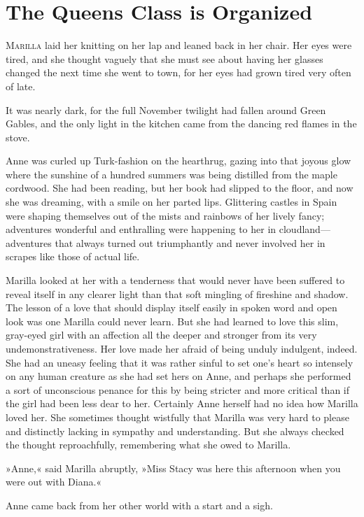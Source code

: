 \chapter{The Queens Class is Organized}

\lettrine[lines=4]{M}{arilla} laid her knitting on her lap and leaned back in her chair. Her eyes were tired, and she thought vaguely that she must see about having her glasses changed the next time she went to town, for her eyes had grown tired very often of late.

It was nearly dark, for the full November twilight had fallen around Green Gables, and the only light in the kitchen came from the dancing red flames in the stove.

Anne was curled up Turk-fashion on the hearthrug, gazing into that joyous glow where the sunshine of a hundred summers was being distilled from the maple cordwood. She had been reading, but her book had slipped to the floor, and now she was dreaming, with a smile on her parted lips. Glittering castles in Spain were shaping themselves out of the mists and rainbows of her lively fancy; adventures wonderful and enthralling were happening to her in cloudland—adventures that always turned out triumphantly and never involved her in scrapes like those of actual life.

Marilla looked at her with a tenderness that would never have been suffered to reveal itself in any clearer light than that soft mingling of fireshine and shadow. The lesson of a love that should display itself easily in spoken word and open look was one Marilla could never learn. But she had learned to love this slim, gray-eyed girl with an affection all the deeper and stronger from its very undemonstrativeness. Her love made her afraid of being unduly indulgent, indeed. She had an uneasy feeling that it was rather sinful to set one's heart so intensely on any human creature as she had set hers on Anne, and perhaps she performed a sort of unconscious penance for this by being stricter and more critical than if the girl had been less dear to her. Certainly Anne herself had no idea how Marilla loved her. She sometimes thought wistfully that Marilla was very hard to please and distinctly lacking in sympathy and understanding. But she always checked the thought reproachfully, remembering what she owed to Marilla.

»Anne,« said Marilla abruptly, »Miss Stacy was here this afternoon when you were out with Diana.«

Anne came back from her other world with a start and a sigh.

